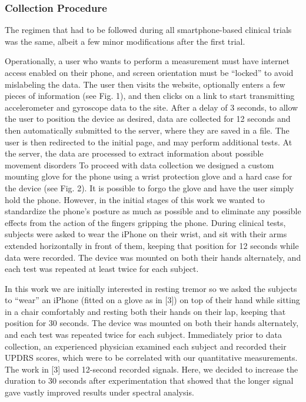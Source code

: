\subsubsection{Collection Procedure}
\label{subsubsec:smartCT1Collection}
The regimen that had to be followed during all smartphone-based clinical trials was the same, albeit a few minor modifications after the first trial. 

Operationally, a user who wants to perform a measurement must have internet access enabled on their phone, and screen orientation must be “locked” to avoid mislabeling the data. The user then visits the website, optionally enters a few pieces of information (see Fig. 1), and then clicks on a link to start transmitting accelerometer and gyroscope data to the site. After a delay of 3 seconds, to allow the user to position the device as desired, data are collected for 12 seconds and then automatically submitted to the server, where they are saved in a file. The user is then redirected to the initial page, and may perform additional tests. At the server, the data are processed to extract information about possible movement disorders
To proceed with data collection we designed a custom mounting glove for the phone using a wrist protection glove and a hard case for the device (see Fig. 2). It is possible to forgo the glove and have the user simply hold the phone. However, in the initial stages of this work we wanted to standardize the phone’s posture as much as possible and to eliminate any possible effects from the action of the fingers gripping the phone.
During clinical tests, subjects were asked to wear the iPhone on their wrist, and sit with their arms extended horizontally in front of them, keeping that position for 12 seconds while data were recorded. The device was mounted on both their hands alternately, and each test was repeated at least twice for each subject. 

In this work we are initially interested in resting tremor so we asked the subjects to “wear” an iPhone (fitted on a glove as in [3]) on top of their hand while sitting in a chair comfortably and resting both their hands on their lap, keeping that position for 30 seconds. The device was mounted on both their hands alternately, and each test was repeated twice for each subject. Immediately prior to data collection, an experienced physician examined each subject and recorded their UPDRS scores, which were to be correlated with our quantitative measurements. 
The work in [3] used 12-second recorded signals. Here, we decided to increase the duration to 30 seconds after experimentation that showed that the longer signal gave vastly improved results under spectral analysis.

